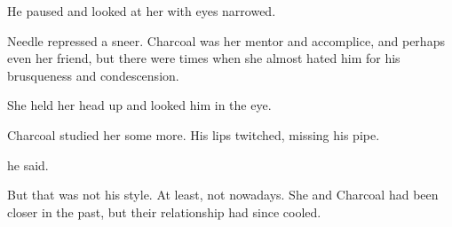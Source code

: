 He paused and looked at her with eyes narrowed. 

Needle repressed a sneer. 
Charcoal was her mentor and accomplice, and perhaps even her friend, but there were times when she almost hated him for his brusqueness and condescension. 

She held her head up and looked him in the eye. 

Charcoal studied her some more. 
His lips twitched, missing his pipe. 

 he said. 

But that was not his style. 
At least, not nowadays. 
She and Charcoal had been closer in the past, but their relationship had since cooled. 


\begin{comment}
Needle is annoyed by the doubt. 
But she also wants to prove herself. 
She doesn't dislike Charcoal. 
He is her mentor, and she owes him. 
But he is a jerk at times. 
She is tired of working under him. 
She longs to be promoted and be his equal, not his servant. 

So she holds her head up high - maybe too high, considering her status, and assures him she can do it. 
"I am nth circle, master. I can do this."

He studies her a bit more. 
"Very well. Do not disappoint me." 

\tho{Or you could have gone with "good luck" or "take care".}
She and Charcoal had been closer in the past, but their relationship had cooled. 

\tho{I will do this. 
  This is my chance to grow out of Charcoal's shadow and prove my worth as a Cabalist. 
  Perhaps I can even secure a promotion.}
\end{comment}









